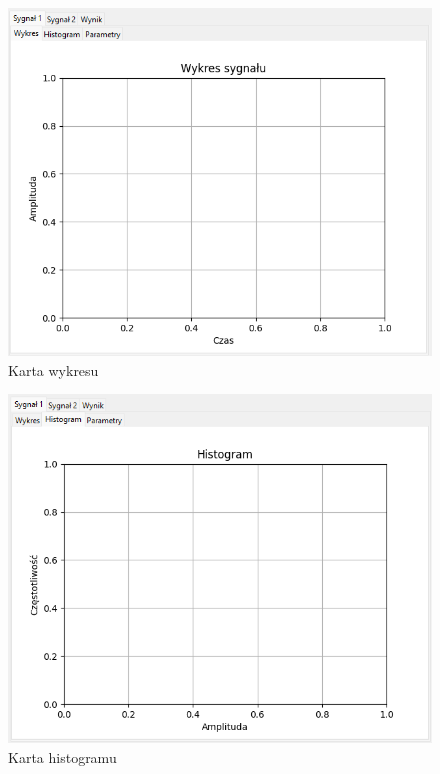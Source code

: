 \documentclass{article}
\begin{document}
\begin{figure}[h!]
    \centering
    \includegraphics[width=\textwidth]{img/wykres.png}
    \caption{Karta wykresu}
\end{figure}
\begin{figure}[h!]
    \centering
    \includegraphics[width=\textwidth]{img/hist.png}
    \caption{Karta histogramu}
\end{figure}
\end{document}
